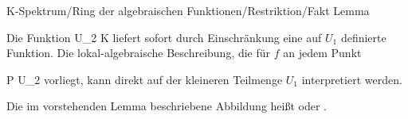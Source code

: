{K-Spektrum/Ring der algebraischen Funktionen/Restriktion/Fakt}
{Lemma}
{}
{



\faktsituation {}
\faktzusatz {}
\faktzusatz {}





}
{





Die Funktion
 { U_2 } { K
} {}
liefert sofort durch Einschränkung eine auf $U_1$ definierte Funktion. Die lokal-algebraische Beschreibung, die für $f$ an jedem Punkt

\mavergleichskette
{\vergleichskette
{ P
}
{ \in }{ U_2
}
{  }{
}
{    }{
}
{   }{
}
}
{}{}{}
vorliegt, kann direkt auf der kleineren Teilmenge $U_1$ interpretiert werden.




}



Die im vorstehenden Lemma beschriebene Abbildung heißt  {} oder  {.}





